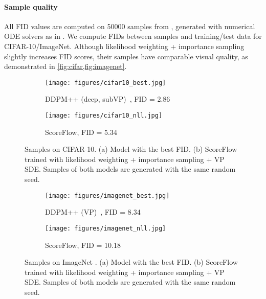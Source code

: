 \paragraph{Sample quality}
All FID values are computed on 50000 samples from , generated with numerical ODE solvers as in \cite{song2020score}. We compute FIDs between samples and training/test data for CIFAR-10/ImageNet. Although likelihood weighting + importance sampling slightly increases FID scores, their samples have comparable visual quality, as demonstrated in \cref{fig:cifar,fig:imagenet}.

\begin{figure}
     \centering
     \begin{subfigure}{\textwidth}
         \centering
         \texttt{[image: figures/cifar10\_best.jpg]}
         \caption{DDPM++ (deep, subVP)~\protect\cite{song2020score}, FID = 2.86}
     \end{subfigure}
     \begin{subfigure}{\textwidth}
         \centering
         \texttt{[image: figures/cifar10\_nll.jpg]}
         \caption{ScoreFlow, FID = 5.34}
     \end{subfigure}
     \caption{Samples on CIFAR-10. (a) Model with the best FID. (b) ScoreFlow trained with likelihood weighting + importance sampling + VP SDE. Samples of both models are generated with the same random seed.}\label{fig:cifar}
\end{figure}

\begin{figure}
     \centering
     \begin{subfigure}{\textwidth}
         \centering
         \texttt{[image: figures/imagenet\_best.jpg]}
         \caption{DDPM++ (VP)~\protect\cite{song2020score}, FID = 8.34}
     \end{subfigure}
     \begin{subfigure}{\textwidth}
         \centering
         \texttt{[image: figures/imagenet\_nll.jpg]}
         \caption{ScoreFlow, FID = 10.18}
     \end{subfigure}
     \caption{Samples on ImageNet . (a) Model with the best FID. (b) ScoreFlow trained with likelihood weighting + importance sampling + VP SDE. Samples of both models are generated with the same random seed.}\label{fig:imagenet}
\end{figure}







